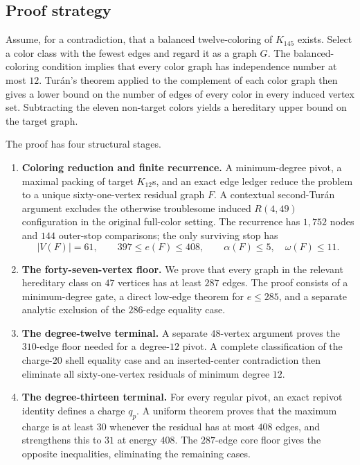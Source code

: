 \subsection{Proof strategy}

Assume, for a contradiction, that a balanced twelve-coloring of $K_{145}$ exists. Select a color class with the fewest edges and regard it as a graph $G$. The balanced-coloring condition implies that every color graph has independence number at most $12$. Tur\'an's theorem applied to the complement of each color graph then gives a lower bound on the number of edges of every color in every induced vertex set. Subtracting the eleven non-target colors yields a hereditary upper bound on the target graph.

The proof has four structural stages.

\begin{enumerate}
\item \textbf{Coloring reduction and finite recurrence.}
A minimum-degree pivot, a maximal packing of target $K_{12}$s, and an exact edge ledger reduce the problem to a unique sixty-one-vertex residual graph $F$. A contextual second-Tur\'an argument excludes the otherwise troublesome induced $R(4,49)$ configuration in the original full-color setting. The recurrence has $1,752$ nodes and $144$ outer-stop comparisons; the only surviving stop has
\[
|V(F)|=61,\qquad 397\leq e(F)\leq408,\qquad
\alpha(F)\leq5,\quad\omega(F)\leq11.
\]

\item \textbf{The forty-seven-vertex floor.}
We prove that every graph in the relevant hereditary class on $47$ vertices has at least $287$ edges. The proof consists of a minimum-degree gate, a direct low-edge theorem for $e\leq285$, and a separate analytic exclusion of the $286$-edge equality case.

\item \textbf{The degree-twelve terminal.}
A separate $48$-vertex argument proves the $310$-edge floor needed for a degree-$12$ pivot. A complete classification of the charge-$20$ shell equality case and an inserted-center contradiction then eliminate all sixty-one-vertex residuals of minimum degree $12$.

\item \textbf{The degree-thirteen terminal.}
For every regular pivot, an exact repivot identity defines a charge $q_p$. A uniform theorem proves that the maximum charge is at least $30$ whenever the residual has at most $408$ edges, and strengthens this to $31$ at energy $408$. The $287$-edge core floor gives the opposite inequalities, eliminating the remaining cases.
\end{enumerate}

